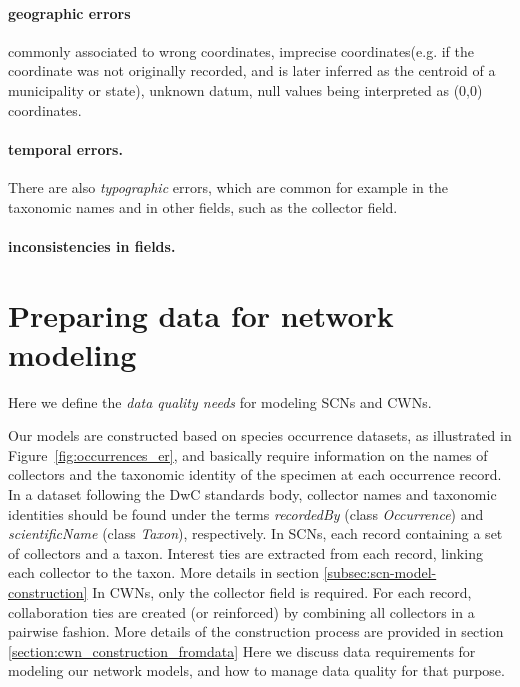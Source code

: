 \paragraph*{geographic errors}commonly associated to 
wrong coordinates, 
imprecise coordinates(e.g. if the coordinate was not originally recorded, and is later inferred as the centroid of a municipality or state), 
unknown datum, 
null values being interpreted as (0,0) coordinates.
%
\paragraph*{temporal errors.}
%
There are also \textit{typographic} errors, which are common for example in the taxonomic names and in other fields, such as the collector field.

\paragraph*{inconsistencies in fields.}




\section{Preparing data for network modeling} %

Here we define the \textit{data quality needs} \cite{KochVeiga2017} for modeling SCNs and CWNs.

Our models are constructed based on species occurrence datasets, as illustrated in Figure~\ref{fig:occurrences_er}, and basically require information on the names of collectors and the taxonomic identity of the specimen at each occurrence record.
In a dataset following the DwC standards body, collector names and taxonomic identities should be found under the terms \textit{recordedBy} (class \textit{Occurrence}) and \textit{scientificName} (class \textit{Taxon}), respectively.
%
In SCNs, each record containing a set of collectors and a taxon. 
Interest ties are extracted from each record, linking each collector to the taxon.
More details in section \ref{subsec:scn-model-construction}
%
In CWNs, only the collector field is required.
For each record, collaboration ties are created (or reinforced) by combining all collectors in a pairwise fashion.
More details  of the construction process are provided in section \ref{section:cwn_construction_fromdata}
%
Here we discuss data requirements for modeling our network models, and how to manage data quality for that purpose.





